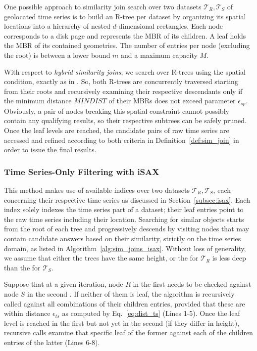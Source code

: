 One possible approach to similarity join search over two datasets $\mathcal{T}_{R}, \mathcal{T}_{S}$ of geolocated time series is to build an R-tree \cite{Guttman1984} per dataset by organizing its spatial locations into a hierarchy of nested $d$-dimensional rectangles. Each node corresponds to a disk page and represents the MBR of its children. A leaf holds the MBR of its contained geometries. The number of entries per node (excluding the root) is between a lower bound $m$ and a maximum capacity $M$.

With respect to {\em hybrid similarity joins}, we search over R-trees using the spatial condition, exactly as in \cite{DBLP:conf/sigmod/BrinkhoffKS93}. So, both R-trees are concurrently traversed starting from their roots and recursively examining their respective descendants only if the minimum distance $MINDIST$ of their MBRs \cite{DBLP:conf/sigmod/RoussopoulosKV95} does not exceed parameter $\epsilon_{sp}$. Obviously, a pair of nodes breaking this spatial constraint cannot possibly contain any qualifying results, so their respective subtrees can be safely pruned. Once the leaf levels are reached, the candidate pairs of raw time series are accessed and refined according to both criteria in Definition~\ref{def:sim_join} in order to issue the final results. 
 


\subsubsection{Time Series-Only Filtering with iSAX}
\label{subsec:isax_appr}

This method makes use of available \isax indices over two datasets $\mathcal{T}_{R}, \mathcal{T}_{S}$, each concerning their respective time series as discussed in Section~\ref{subsec:isax}. Each \isax index solely indexes the time series part of a dataset; their leaf entries point to the raw time series including their location. Searching for similar objects starts from the root of each tree and progressively descends by visiting nodes that may contain candidate answers based on their similarity, strictly on the time series domain, as listed in Algorithm~\ref{alg:sim_joins_isax}. Without loss of generality, we assume that either the trees have the same height, or the \isax for $\mathcal{T}_{R}$ is less deep than the \isax for $\mathcal{T}_{S}$.

Suppose that at a given iteration, node $R$ in the first \isax needs to be checked against node $S$ in the second \isax. If neither of them is leaf, the algorithm is recursively called against all combinations of their children entries, provided that these are within distance $\epsilon_{ts}$ as computed by Eq.~\ref{eq:dist_ts} (Lines 1-5). Once the leaf level is reached in the first \isax but not yet in the second \isax (if they differ in height), recursive calls examine that specific leaf of the former against each of the children entries of the latter (Lines 6-8).

